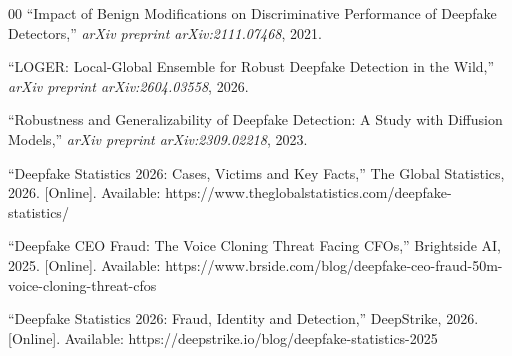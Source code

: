 \documentclass[conference]{IEEEtran}
\begin{document}
\begin{thebibliography}{00}
``Impact of Benign Modifications on Discriminative Performance of Deepfake Detectors,'' \emph{arXiv preprint arXiv:2111.07468}, 2021.

``LOGER: Local-Global Ensemble for Robust Deepfake Detection in the Wild,'' \emph{arXiv preprint arXiv:2604.03558}, 2026.

``Robustness and Generalizability of Deepfake Detection: A Study with Diffusion Models,'' \emph{arXiv preprint arXiv:2309.02218}, 2023.

``Deepfake Statistics 2026: Cases, Victims and Key Facts,'' The Global Statistics, 2026. [Online]. Available: https://www.theglobalstatistics.com/deepfake-statistics/

``Deepfake CEO Fraud: The Voice Cloning Threat Facing CFOs,'' Brightside AI, 2025. [Online]. Available: https://www.brside.com/blog/deepfake-ceo-fraud-50m-voice-cloning-threat-cfos

``Deepfake Statistics 2026: Fraud, Identity and Detection,'' DeepStrike, 2026. [Online]. Available: https://deepstrike.io/blog/deepfake-statistics-2025

\end{thebibliography}
\end{document}
